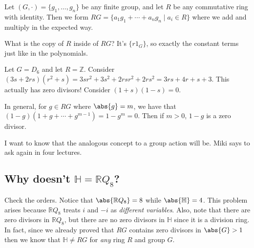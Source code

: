 Let $(G, \cdot) = \{g_1, \dotsc, g_n\}$ be any finite group, and let $R$ be any commutative ring with identity. Then we form $RG = \{a_1g_1 + \cdots + a_ng_n \mid a_i \in R\}$ where we add and multiply in the expected way.

\begin{problem}
What is the copy of $R$ inside of $RG$? It's $\{r1_G\}$, so exactly the constant terms just like in the polynomials.
\end{problem}

\begin{example}
Let $G = D_6$ and let $R = \mathbb{Z}$. Consider $(3s + 2rs)(r^2 + s) = 3sr^2 + 3s^2 + 2rsr^2 +2rs^2 = 3rs + 4r + s + 3$. This actually has zero divisors! Consider $(1+s)(1-s) = 0$.
\end{example}

In general, for $g \in RG$ where $\abs{g} = m$, we have that $(1-g)(1 + g + \cdots + g^{m-1}) = 1 - g^{m} = 0$. Then if $m > 0$, $1-g$ is a zero divisor.

I want to know that the analogous concept to a group action will be. Miki says to ask again in four lectures.

\subsection{Why doesn't \texorpdfstring{$\mathbb{H} = \mathbb{R} Q_8$}{H = RQ8}?}

Check the orders. Notice that $\abs{\mathbb{R} Q_8} = 8$ while $\abs{\mathbb{H}} = 4$. This problem arises because $\mathbb{R} Q_8$ treats $i$ and $-i$ as \emph{different variables}. Also, note that there are zero divisors in $\mathbb{R} Q_8$, but there are no zero divisors in $\mathbb{H}$ since it is a division ring. In fact, since we already proved that $RG$ contains zero divisors in $\abs{G} > 1$ then we know that $\mathbb{H} \not= RG$ for \emph{any} ring $R$ and group $G$.